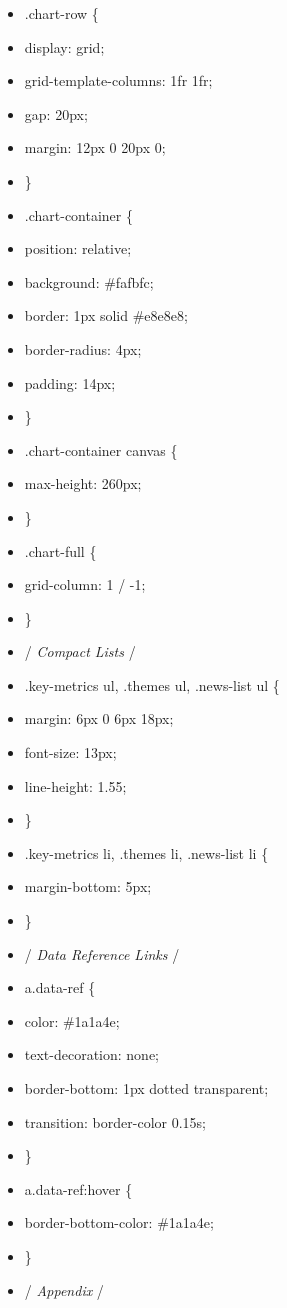 \documentclass[11pt]{article}
\begin{document}
\begin{itemize}[leftmargin=*,itemsep=2pt,topsep=2pt]
\item {} .chart-row \{
\item {} display: grid;
\item {} grid-template-columns: 1fr 1fr;
\item {} gap: 20px;
\item {} margin: 12px 0 20px 0;
\item {} \}
\item {} .chart-container \{
\item {} position: relative;
\item {} background: \#fafbfc;
\item {} border: 1px solid \#e8e8e8;
\item {} border-radius: 4px;
\item {} padding: 14px;
\item {} \}
\item {} .chart-container canvas \{
\item {} max-height: 260px;
\item {} \}
\item {} .chart-full \{
\item {} grid-column: 1 / -1;
\item {} \}
\item {} /\emph{ Compact Lists }/
\item {} .key-metrics ul, .themes ul, .news-list ul \{
\item {} margin: 6px 0 6px 18px;
\item {} font-size: 13px;
\item {} line-height: 1.55;
\item {} \}
\item {} .key-metrics li, .themes li, .news-list li \{
\item {} margin-bottom: 5px;
\item {} \}
\item {} /\emph{ Data Reference Links }/
\item {} a.data-ref \{
\item {} color: \#1a1a4e;
\item {} text-decoration: none;
\item {} border-bottom: 1px dotted transparent;
\item {} transition: border-color 0.15s;
\item {} \}
\item {} a.data-ref:hover \{
\item {} border-bottom-color: \#1a1a4e;
\item {} \}
\item {} /\emph{ Appendix }/

\end{itemize}
\end{document}
